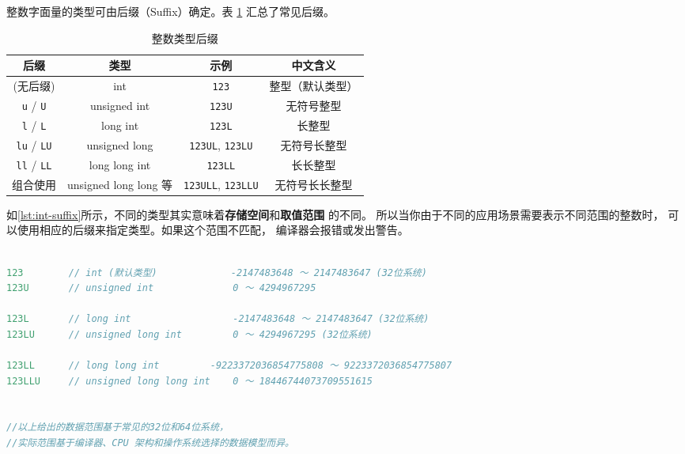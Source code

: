 整数字面量的类型可由后缀（Suffix）确定。表 \ref{tab:int-suffix} 汇总了常见后缀。

\begin{table}[h]
\centering
\caption{整数类型后缀}\label{tab:int-suffix}
\begin{tabular}{cccc}
\hline
后缀 & 类型 & 示例 & 中文含义 \\ \hline
(无后缀) & int & \verb|123| & 整型（默认类型） \\

\verb|u| / \verb|U| & unsigned int & \verb|123U| & 无符号整型 \\

\verb|l| / \verb|L| & long int & \verb|123L| & 长整型 \\

\verb|lu| / \verb|LU| & unsigned long & \verb|123UL|, \verb|123LU| & 无符号长整型 \\

\verb|ll| / \verb|LL| & long long int & \verb|123LL| & 长长整型 \\

组合使用 & unsigned long long 等 & \verb|123ULL|, \verb|123LLU| & 无符号长长整型 \\ \hline
\end{tabular}
\end{table}



如\autoref{lst:int-suffix}所示，不同的类型其实意味着\textbf{存储空间}和\textbf{取值范围}
的不同。
所以当你由于不同的应用场景需要表示不同范围的整数时，
可以使用相应的后缀来指定类型。如果这个范围不匹配，
编译器会报错或发出警告。
\newpage


\begin{lstlisting}[language=C,caption={后缀示例},label={lst:int-suffix}]

123        // int (默认类型)             -2147483648 ～ 2147483647 (32位系统)
123U       // unsigned int              0 ～ 4294967295

123L       // long int                  -2147483648 ～ 2147483647 (32位系统)
123LU      // unsigned long int         0 ～ 4294967295 (32位系统)

123LL      // long long int         -9223372036854775808 ～ 9223372036854775807
123LLU     // unsigned long long int    0 ～ 18446744073709551615

  
//以上给出的数据范围基于常见的32位和64位系统，
//实际范围基于编译器、CPU 架构和操作系统选择的数据模型而异。

\end{lstlisting}

